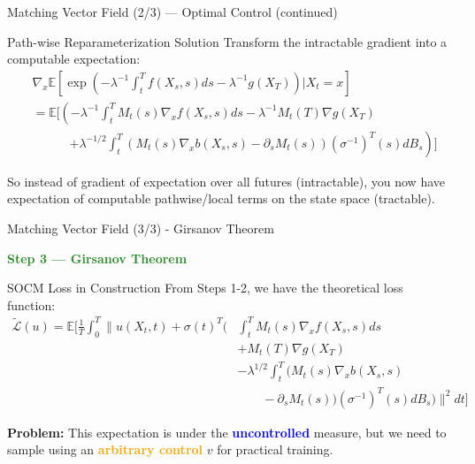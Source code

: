 \documentclass[aspectratio=169,xcolor=dvipsnames]{beamer}
\begin{document}
\begin{frame}[allowframebreaks]{Matching Vector Field (2/3) — Optimal Control (continued)}
    \begin{alertblock}{Path-wise Reparameterization Solution}
        Transform the intractable gradient into a computable expectation:
        \begin{equation}
        \begin{aligned}
        &\nabla_x \mathbb{E}\left[\exp\left(-\lambda^{-1}\int_t^T f(X_s,s)ds - \lambda^{-1}g(X_T)\right) \bigg| X_t = x\right] \\[6pt]
        &= \mathbb{E}\Bigg[\left(-\lambda^{-1}\int_t^T M_t(s)\nabla_x f(X_s,s)ds - \lambda^{-1}M_t(T)\nabla g(X_T)\right. \\[4pt]
        &\qquad\quad \left.+ \lambda^{-1/2}\int_t^T (M_t(s)\nabla_x b(X_s,s) - \partial_s M_t(s))(\sigma^{-1})^T(s)dB_s\right) \Bigg]
        \end{aligned}
        \end{equation}

        \small
     So instead of gradient of expectation over all futures (intractable), you now have expectation of computable pathwise/local terms on the state space (tractable).
    \end{alertblock}


\end{frame}

\begin{frame}[allowframebreaks]{Matching Vector Field (3/3) - Girsanov Theorem}

    \begin{center}
        \Large\textcolor{ForestGreen}{\textbf{Step 3 — Girsanov Theorem}}
    \end{center}
    
    \vspace{0.3cm}
    
    \begin{block}{SOCM Loss in Construction}
    From Steps 1-2, we have the theoretical loss function:
    \begin{equation}
    \begin{aligned}
    \tilde{\mathcal{L}}(u) = \mathbb{E}\Bigg[\frac{1}{T}\int_0^T \Bigg\|u(X_t,t) + \sigma(t)^T \Bigg(
    &\int_t^T M_t(s)\nabla_x f(X_s,s)ds \\[3pt]
    &+ M_t(T)\nabla g(X_T) \\[3pt] 
    &- \lambda^{1/2}\int_t^T (M_t(s)\nabla_x b(X_s,s) \\[3pt]
    &\qquad - \partial_s M_t(s))(\sigma^{-1})^T(s)dB_s
    \Bigg)\Bigg\|^2 dt \Bigg]
    \end{aligned}
    \end{equation}
        
        \textbf{Problem:} This expectation is under the \textcolor{blue}{\textbf{uncontrolled}} measure, but we need to sample using an \textcolor{orange}{\textbf{arbitrary control}} $v$ for practical training.
    \end{block}

\end{frame}
\end{document}
